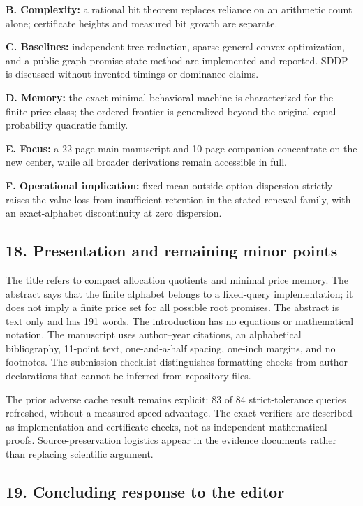 \documentclass[
  11pt,
]{article}
\begin{document}
\textbf{B. Complexity:} a rational bit theorem replaces reliance on an
arithmetic count alone; certificate heights and measured bit growth are
separate.

\textbf{C. Baselines:} independent tree reduction, sparse general convex
optimization, and a public-graph promise-state method are implemented
and reported. SDDP is discussed without invented timings or dominance
claims.

\textbf{D. Memory:} the exact minimal behavioral machine is
characterized for the finite-price class; the ordered frontier is
generalized beyond the original equal-probability quadratic family.

\textbf{E. Focus:} a 22-page main manuscript and 10-page companion
concentrate on the new center, while all broader derivations remain
accessible in full.

\textbf{F. Operational implication:} fixed-mean outside-option
dispersion strictly raises the value loss from insufficient retention in
the stated renewal family, with an exact-alphabet discontinuity at zero
dispersion.

\subsection{18. Presentation and remaining minor
points}\label{presentation-and-remaining-minor-points}

The title refers to compact allocation quotients and minimal price
memory. The abstract says that the finite alphabet belongs to a
fixed-query implementation; it does not imply a finite price set for all
possible root promises. The abstract is text only and has 191 words. The
introduction has no equations or mathematical notation. The manuscript
uses author--year citations, an alphabetical bibliography, 11-point
text, one-and-a-half spacing, one-inch margins, and no footnotes. The
submission checklist distinguishes formatting checks from author
declarations that cannot be inferred from repository files.

The prior adverse cache result remains explicit: 83 of 84
strict-tolerance queries refreshed, without a measured speed advantage.
The exact verifiers are described as implementation and certificate
checks, not as independent mathematical proofs. Source-preservation
logistics appear in the evidence documents rather than replacing
scientific argument.

\subsection{19. Concluding response to the
editor}\label{concluding-response-to-the-editor}
\end{document}
